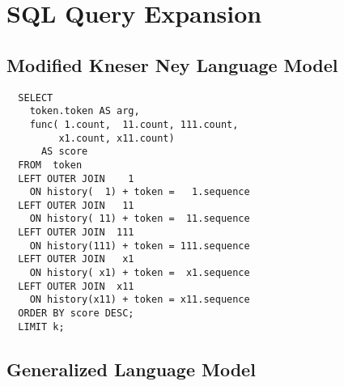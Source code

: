 \documentclass[m,bachelor,binding]{WeSTthesis}
\begin{document}
{\begin{appendices}
\begin{landscape}
\begin{figure}[H]
  \end{figure}
\end{landscape}

\section{SQL Query Expansion}


\subsection{Modified Kneser Ney Language Model}

\begin{lstlisting}
  SELECT
    token.token AS arg,
    func( 1.count,  11.count, 111.count,
         x1.count, x11.count)
      AS score
  FROM  token
  LEFT OUTER JOIN    1
    ON history(  1) + token =   1.sequence
  LEFT OUTER JOIN   11
    ON history( 11) + token =  11.sequence
  LEFT OUTER JOIN  111
    ON history(111) + token = 111.sequence
  LEFT OUTER JOIN   x1
    ON history( x1) + token =  x1.sequence
  LEFT OUTER JOIN  x11
    ON history(x11) + token = x11.sequence
  ORDER BY score DESC;
  LIMIT k;
\end{lstlisting}

\clearpage
\subsection{Generalized Language Model}


\end{appendices}}
\end{document}
